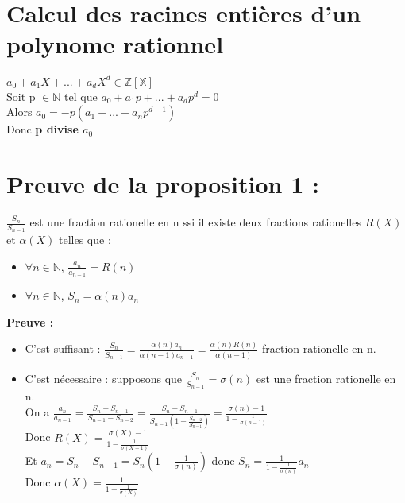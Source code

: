 \documentclass[17 pt,french]{scrartcl}
\begin{document}
	\section*{Calcul des racines entières d'un polynome rationnel}
	$a_0 + a_1X + ... + a_dX^d \in \mathbb{Z[X]}$\\
	Soit p $\in \mathbb{N}$ tel que $a_0 + a_1p + ... + a_dp^d = 0$\\
	Alors $a_0 = -p(a_1 + ... + a_np^{d-1})$\\
	Donc \textbf{p divise $a_0$}
	\section*{Preuve de la proposition 1 : }
	$\frac{S_n}{S_{n-1}}$ est une fraction rationelle en n ssi il existe deux fractions rationelles $R(X)$ et $\alpha(X)$ telles que : 
	 \begin{itemize}
	 \item $\forall n \in \mathbb{N}$, $\frac{a_n}{a_{n-1}} = R(n)$
	 \item $\forall n \in \mathbb{N}$, $S_n = \alpha(n)a_n$
	 \end{itemize}
	 \textbf{Preuve : }\\
	 \begin{itemize}
	 \item C'est suffisant : $\frac{S_n}{S_{n-1}} = \frac{\alpha(n)a_n}{\alpha(n-1)a_{n-1}} = \frac{\alpha(n)R(n)}{\alpha(n-1)}$ fraction rationelle en n.
	 \item C'est nécessaire : supposons que $\frac{S_n}{S_{n-1}} = \sigma(n)$ est une fraction rationelle en n.\\
	 On a $\frac{a_n}{a_{n-1}} = \frac{S_n-S_{n-1}}{S_{n-1}-S_{n-2}} = \frac{S_n-S_{n-1}}{S_{n-1}(1-\frac{S_{n-2}}{S_{n-1}})} = \frac{\sigma(n)-1}{1-\frac{1}{\sigma(n-1)}}$ \\
	 Donc $R(X) = \frac{\sigma(X)-1}{1-\frac{1}{\sigma(X-1)}}$\\
	 Et $a_n = S_n-S_{n-1} = S_n(1-\frac{1}{\sigma(n)})$ donc $S_n = \frac{1}{1-\frac{1}{\sigma(n)}}a_n$\\
	 Donc $\alpha(X) =  \frac{1}{1-\frac{1}{\sigma(X)}}$
	 \end{itemize}
	 
	 
	 
	 
	 
	 
	 
	\newpage
\end{document}
